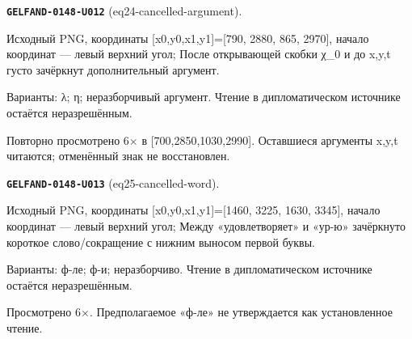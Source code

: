 \documentclass[11pt]{article}
\theoremstyle{definition}
\theoremstyle{remark}
\begin{document}
\noindent\leavevmode{}\label{GELFAND-P001361:eq24-cancelled-argument:note}\textbf{\texttt{GELFAND-0148-U012}} (eq24-cancelled-argument).\par\nopagebreak[4]
Исходный PNG, координаты [x0,y0,x1,y1]=[790, 2880, 865, 2970], начало координат — левый верхний угол; После открывающей скобки χ\_0 и до x,y,t густо зачёркнут дополнительный аргумент.\par
Варианты: λ; η; неразборчивый аргумент. Чтение в дипломатическом источнике остаётся неразрешённым.\par
Повторно просмотрено 6× в [700,2850,1030,2990]. Оставшиеся аргументы x,y,t читаются; отменённый знак не восстановлен.\par\medskip
\noindent\leavevmode{}\label{GELFAND-P001361:eq25-cancelled-word:note}\textbf{\texttt{GELFAND-0148-U013}} (eq25-cancelled-word).\par\nopagebreak[4]
Исходный PNG, координаты [x0,y0,x1,y1]=[1460, 3225, 1630, 3345], начало координат — левый верхний угол; Между «удовлетворяет» и «ур-ю» зачёркнуто короткое слово/сокращение с нижним выносом первой буквы.\par
Варианты: ф-ле; ф-и; неразборчиво. Чтение в дипломатическом источнике остаётся неразрешённым.\par
Просмотрено 6×. Предполагаемое «ф-ле» не утверждается как установленное чтение.\par\medskip
\end{document}
